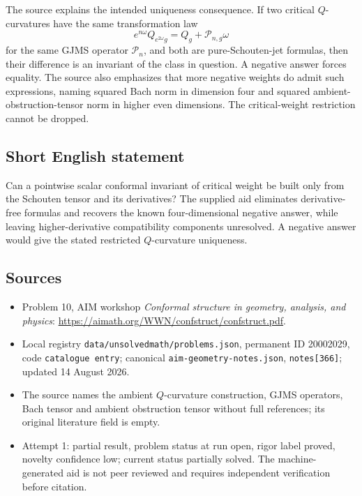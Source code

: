 \documentclass[11pt]{article}
\begin{document}
The source explains the intended uniqueness consequence. If two critical \(Q\)-curvatures have the same transformation law
\[
e^{n\omega}Q_{e^{2\omega}g}=Q_g+\mathcal P_{n,g}\omega
\]
for the same GJMS operator \(\mathcal P_n\), and both are pure-Schouten-jet formulas, then their difference is an invariant of the class in question. A negative answer forces equality. The source also emphasizes that more negative weights do admit such expressions, naming squared Bach norm in dimension four and squared ambient-obstruction-tensor norm in higher even dimensions. The critical-weight restriction cannot be dropped.
\subsection{Short English statement}
Can a pointwise scalar conformal invariant of critical weight be built only from the Schouten tensor and its derivatives? The supplied aid eliminates derivative-free formulas and recovers the known four-dimensional negative answer, while leaving higher-derivative compatibility components unresolved. A negative answer would give the stated restricted \(Q\)-curvature uniqueness.
\subsection{Sources}
\begin{itemize}
\item Problem 10, AIM workshop \emph{Conformal structure in geometry, analysis, and physics}: \url{https://aimath.org/WWN/confstruct/confstruct.pdf}.
\item Local registry \texttt{data/unsolvedmath/problems.json}, permanent ID 20002029, code \texttt{catalogue entry}; canonical \texttt{aim-geometry-notes.json}, \texttt{notes[366]}; updated 14 August 2026.
\item The source names the ambient \(Q\)-curvature construction, GJMS operators, Bach tensor and ambient obstruction tensor without full references; its original literature field is empty.
\item Attempt 1: partial result, problem status at run open, rigor label proved, novelty confidence low; current status partially solved. The machine-generated aid is not peer reviewed and requires independent verification before citation.
\end{itemize}
\end{document}
